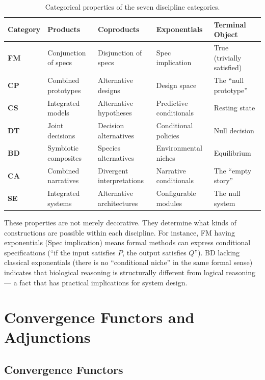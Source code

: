 \documentclass[11pt,a4paper]{article}
\begin{document}
\begin{table}[htbp]
\centering
\small
\begin{tabular}{>{\bfseries}l l l l l}
\toprule
Category & Products & Coproducts & Exponentials & Terminal Object \\
\midrule
FM & Conjunction of specs & Disjunction of specs & Spec implication & True (trivially satisfied) \\
CP & Combined prototypes & Alternative designs & Design space & The ``null prototype'' \\
CS & Integrated models & Alternative hypotheses & Predictive conditionals & Resting state \\
DT & Joint decisions & Decision alternatives & Conditional policies & Null decision \\
BD & Symbiotic composites & Species alternatives & Environmental niches & Equilibrium \\
CA & Combined narratives & Divergent interpretations & Narrative conditionals & The ``empty story'' \\
SE & Integrated systems & Alternative architectures & Configurable modules & The null system \\
\bottomrule
\end{tabular}
\caption{Categorical properties of the seven discipline categories.}
\label{tab:properties}
\end{table}

These properties are not merely decorative. They determine what kinds of constructions are possible within each discipline. For instance, FM having exponentials (Spec implication) means formal methods can express conditional specifications (``if the input satisfies $P$, the output satisfies $Q$''). BD lacking classical exponentials (there is no ``conditional niche'' in the same formal sense) indicates that biological reasoning is structurally different from logical reasoning --- a fact that has practical implications for system design.

\section{Convergence Functors and Adjunctions}

\subsection{Convergence Functors}
\end{document}
